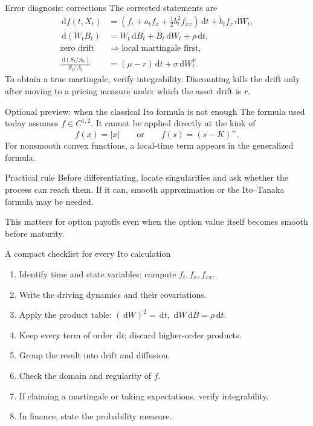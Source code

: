 \documentclass[handout,10pt,aspectratio=169]{beamer}
\newcommand{\Pp}{\mathbb P}
\newcommand{\dd}{\,\mathrm d}
\begin{document}
\begin{frame}{Error diagnosis: corrections}
The corrected statements are
\[
\begin{aligned}
\dd f(t,X_t)
&=\left(f_t+a_tf_x+\frac12b_t^2f_{xx}\right)\dd t+b_tf_x\dd W_t,\\
\dd(W_tB_t)&=W_t\dd B_t+B_t\dd W_t+\rho\dd t,\\
\text{zero drift}&\Longrightarrow\text{local martingale first},\\
\frac{\dd(S_t/A_t)}{S_t/A_t}
&=(\mu-r)\dd t+\sigma\dd W_t^{\Pp}.
\end{aligned}
\]
To obtain a true martingale, verify integrability. Discounting kills the drift only after moving to a pricing measure under which the asset drift is \(r\).
\end{frame}

\begin{frame}{Optional preview: when the classical Ito formula is not enough}
The formula used today assumes \(f\in C^{1,2}\). It cannot be applied directly at the kink of
\[
f(x)=|x|
\qquad\text{or}\qquad
f(s)=(s-K)^+.
\]
For nonsmooth convex functions, a local-time term appears in the generalized formula.
\begin{alertblock}{Practical rule}
Before differentiating, locate singularities and ask whether the process can reach them. If it can, smooth approximation or the Ito--Tanaka formula may be needed.
\end{alertblock}
This matters for option payoffs even when the option value itself becomes smooth before maturity.
\end{frame}

\begin{frame}{A compact checklist for every Ito calculation}
\begin{enumerate}
\item Identify time and state variables; compute \(f_t,f_x,f_{xx}\).
\item Write the driving dynamics and their covariations.
\item Apply the product table: \((\dd W)^2=\dd t\), \(\dd W\dd B=\rho\dd t\).
\item Keep every term of order \(\dd t\); discard higher-order products.
\item Group the result into drift and diffusion.
\item Check the domain and regularity of \(f\).
\item If claiming a martingale or taking expectations, verify integrability.
\item In finance, state the probability measure.
\end{enumerate}
\end{frame}
\end{document}
